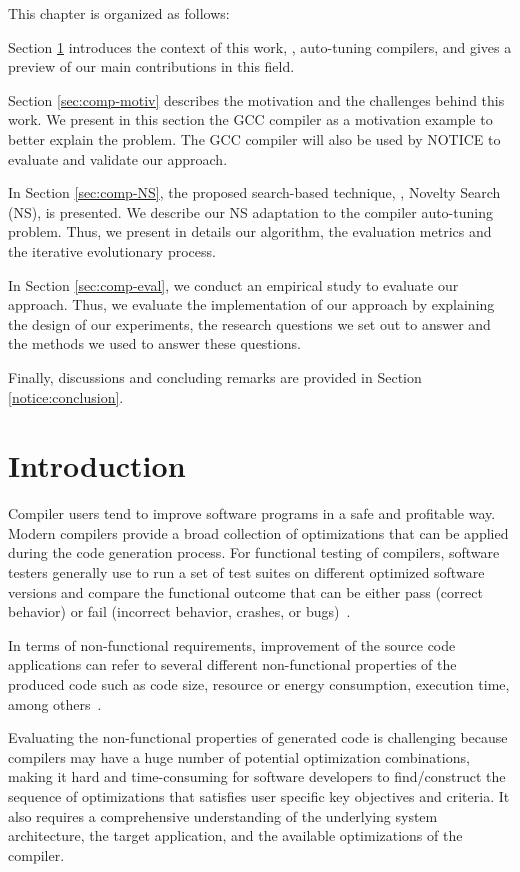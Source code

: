 This chapter is organized as follows: 

Section \ref{sec:comp-intro} introduces the context of this work, \ie, auto-tuning compilers, and gives a preview of our main contributions in this field.

Section \ref{sec:comp-motiv} describes the motivation and the challenges behind this work. We present in this section the GCC compiler as a motivation example to better explain the problem. The GCC compiler will also be used by NOTICE to evaluate and validate our approach. 

In Section \ref{sec:comp-NS}, the proposed search-based technique, \ie, Novelty Search (NS), is presented. We describe our NS adaptation to the compiler auto-tuning problem. Thus, we present in details our algorithm, the evaluation metrics and the iterative evolutionary process. 

In Section \ref{sec:comp-eval}, we conduct an empirical study to evaluate our approach. Thus, we evaluate the implementation of our approach by explaining the design of our experiments, the research questions we set out to answer and the methods we used to answer these questions.

Finally, discussions and concluding remarks are provided in Section \ref{notice:conclusion}\@.
	


\section{Introduction}
\label{sec:comp-intro}
Compiler users tend to improve software programs in a safe and profitable way. Modern compilers provide a broad collection of optimizations that can be applied during the code generation process. 
For functional testing of compilers, software testers generally use to run a set of test suites on different optimized software versions and compare the functional outcome that can be either pass (correct behavior) or fail (incorrect behavior, crashes, or bugs)~\cite{chen2016empirical,hoste2008cole,le2014compiler}.

In terms of non-functional requirements, improvement of the source code applications can refer to several different non-functional properties of the produced code such as code size, resource or energy consumption, execution time, among others~\cite{almagor2004finding,pan2006fast}.

Evaluating the non-functional properties of generated code is challenging because compilers may have a huge number of potential optimization combinations, making it hard and time-consuming for software developers to find/construct the sequence of optimizations that satisfies user specific key objectives and criteria. It also requires a comprehensive understanding of the underlying system architecture, the target application, and the available optimizations of the compiler.

